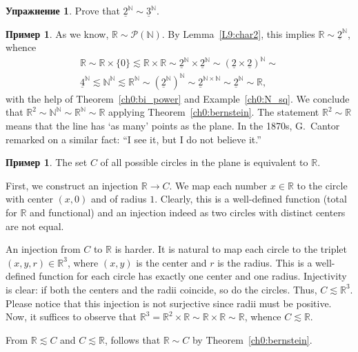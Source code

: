 \documentclass[12pt,notitlepage]{article}
\theoremstyle{plain}
\theoremstyle{definition}
\newtheorem{exc}[thm]{Упражнение}
\newtheorem{exm}[thm]{Пример}
\theoremstyle{plain}
\newcommand{\N}{\mathbb{N}}
\newcommand{\R}{\mathbb{R}}
\newcommand{\mP}{\mathcal{P}}
\newcommand{\ul}[1]{\underline{#1}}
\newcommand{\1}{\mathbf{1}}
\newcommand{\0}{\mathbf{0}}
\begin{document}
\begin{exc}
	Prove that $\ul{2}^\N \sim \ul{3}^\N$.
\end{exc}

\begin{exm}\label{eq_sets:big_exm}
	As we know, $\R \sim \mP(\N)$. By Lemma~\ref{L9:char2}, this implies $\R \sim \ul{2}^\N$, whence
	\begin{multline*}
		\R \sim \R \times \{0\} \lesssim \R \times \R \sim \ul{2}^\N \times \ul{2}^\N \sim (\ul{2} \times \ul{2})^\N \sim\\
		\ul{4}^\N \lesssim \N^\N \lesssim \R^\N \sim (\ul{2}^\N)^\N \sim \ul{2}^{\N \times \N} \sim \ul{2}^\N \sim \R,
	\end{multline*}
	with the help of Theorem~\ref{ch0:bi_power} and Example~\ref{ch0:N_sq}. We conclude that $\R^2 \sim \N^\N \sim \R^\N \sim \R$ applying Theorem~\ref{ch0:bernstein}. The statement $\R^2 \sim \R$ means that the line has `as many' points as the plane. In the 1870s, G.~Cantor remarked on a similar fact: ``I see it, but I do not believe it.''
\end{exm}

\begin{exm}
	The set $C$ of all possible circles in the plane is equivalent to $\R$.
	
	First, we construct an injection $\R \to C$. We map each number $x \in \R$ to the circle with center $(x, 0)$ and of radius $1$. Clearly, this is a well-defined function (total for $\R$ and functional) and an injection indeed as two circles with distinct centers are not equal.
	
	An injection from $C$ to $\R$ is harder. It is natural to map each circle to the triplet $(x, y, r) \in \R^3$, where $(x, y)$ is the center and $r$ is the radius. This is a well-defined function for each circle has exactly one center and one radius. Injectivity is clear: if both the centers and the radii coincide, so do the circles. Thus, $C \lesssim \R^3$. Please notice that this injection is not surjective since radii must be positive. Now, it suffices to observe that $\R^3 = \R^2 \times \R \sim \R \times \R \sim \R$, whence $C \lesssim \R$. 
	
	From $\R \lesssim C$ and $C \lesssim \R$, follows that $\R \sim C$ by Theorem~\ref{ch0:bernstein}.
\end{exm}
\end{document}
